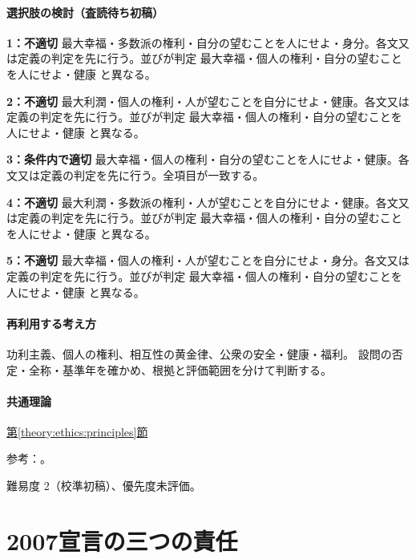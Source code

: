 \paragraph{選択肢の検討（査読待ち初稿）}\mbox{}\par

\noindent\textbf{1：不適切} 最大幸福・多数派の権利・自分の望むことを人にせよ・身分。各文又は定義の判定を先に行う。並びが判定 最大幸福・個人の権利・自分の望むことを人にせよ・健康 と異なる。\par

\noindent\textbf{2：不適切} 最大利潤・個人の権利・人が望むことを自分にせよ・健康。各文又は定義の判定を先に行う。並びが判定 最大幸福・個人の権利・自分の望むことを人にせよ・健康 と異なる。\par

\noindent\textbf{3：条件内で適切} 最大幸福・個人の権利・自分の望むことを人にせよ・健康。各文又は定義の判定を先に行う。全項目が一致する。\par

\noindent\textbf{4：不適切} 最大利潤・多数派の権利・人が望むことを自分にせよ・健康。各文又は定義の判定を先に行う。並びが判定 最大幸福・個人の権利・自分の望むことを人にせよ・健康 と異なる。\par

\noindent\textbf{5：不適切} 最大幸福・個人の権利・人が望むことを自分にせよ・身分。各文又は定義の判定を先に行う。並びが判定 最大幸福・個人の権利・自分の望むことを人にせよ・健康 と異なる。\par

\paragraph{再利用する考え方} 功利主義、個人の権利、相互性の黄金律、公衆の安全・健康・福利。 設問の否定・全称・基準年を確かめ、根拠と評価範囲を分けて判断する。

\paragraph{共通理論} \hyperref[theory:ethics:principles]{第\ref*{theory:ethics:principles}節}

\par 参考：\cite{scu_ethics_framework,ipej_ethics2011}。

\par 難易度 2（校準初稿）、優先度未評価。

\section{2007宣言の三つの責任}

